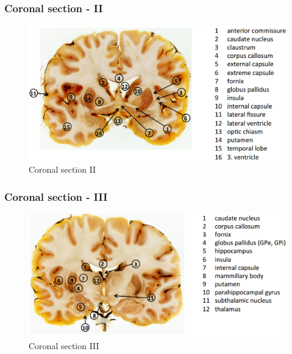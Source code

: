 \documentclass[12pt,article,oneside,a4paper]{memoir}
\begin{document}
\subsubsection{Coronal section - II}
\begin{figure}[H]
	\centering
  	\includegraphics[width=\linewidth]{imgs/coronal-section-II-answer.png}
	\caption{Coronal section II}
  	\label{fig:coronalSectionII-answer}
\end{figure}

\subsubsection{Coronal section - III}
\begin{figure}[H]
	\centering
  	\includegraphics[width=\linewidth]{imgs/coronal-section-III-answer.png}
	\caption{Coronal section III}
  	\label{fig:coronalSectionIII-answer}
\end{figure}
\end{document}

